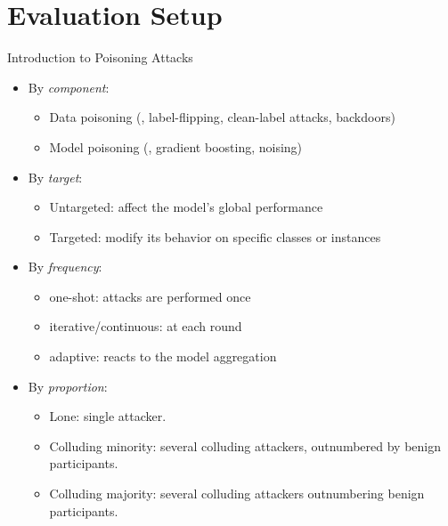 \section{Evaluation Setup}

\begin{frame}
  \sectionpage
\end{frame}

\begin{frame}{Introduction to Poisoning Attacks}
  \begin{itemize}
    \item By \emph{component}:
    \begin{itemize}
      \item Data poisoning (\eg, \alert<5>{label-flipping}, clean-label attacks, backdoors)
      \item Model poisoning (\eg, gradient boosting, noising)
    \end{itemize}\emph{}

    \pause
    \item By \emph{target}:
    \begin{itemize}
      \item \alert<5>{Untargeted}: affect the model's global performance
      \item \alert<5>{Targeted}: modify its behavior on specific classes or instances
    \end{itemize}

    \pause
    \item By \emph{frequency}:
    \begin{itemize}
      \item one-shot: attacks are performed once
      \item \alert<5>{iterative}/\alert<5>{continuous}: at each round
      \item adaptive: reacts to the model aggregation
    \end{itemize}

    \pause
    \item By \emph{proportion}:
    \begin{itemize}
      \item \alert<5>{Lone}: single attacker.
      \item \alert<5>{Colluding minority}: several colluding attackers, outnumbered by benign participants. 
      \item \alert<5>{Colluding majority}: several colluding attackers outnumbering benign participants.
    \end{itemize}
  \end{itemize}
\end{frame}

